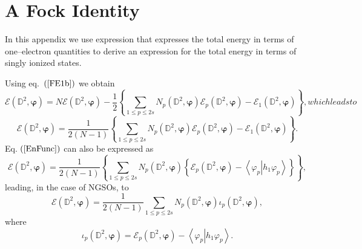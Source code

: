 \documentclass[aps,preprint]{revtex4}%
\begin{document}
\section{A Fock Identity\label{FockID}}

In this appendix we use expression that expresses the total energy in terms of
one--electron quantities to derive an expression for the total energy in terms
of singly ionized states.

Using eq.\ $\left(  \ref{FE1b}\right)  $ we obtain
\begin{subequations}
\begin{equation}
\mathcal{E}\left(  \mathbb{D}^{2},\boldsymbol{\varphi}\right)  =N\mathcal{E}%
\left(  \mathbb{D}^{2},\boldsymbol{\varphi}\right)  -\frac{1}{2}\left\{
\sum_{1\leq p\leq2s}N_{p}\left(  \mathbb{D}^{2},\boldsymbol{\varphi}\right)
\mathcal{E}_{p}\left(  \mathbb{D}^{2},\boldsymbol{\varphi}\right)
-\mathcal{E}_{1}\left(  \mathbb{D}^{2},\boldsymbol{\varphi}\right)  \right\}
,
\end{equation}
which leads to
\end{subequations}
\begin{equation}
\mathcal{E}\left(  \mathbb{D}^{2},\boldsymbol{\varphi}\right)  =\frac
{1}{2\left(  N-1\right)  }\left\{  \sum_{1\leq p\leq2s}N_{p}\left(
\mathbb{D}^{2},\boldsymbol{\varphi}\right)  \mathcal{E}_{p}\left(
\mathbb{D}^{2},\boldsymbol{\varphi}\right)  -\mathcal{E}_{1}\left(
\mathbb{D}^{2},\boldsymbol{\varphi}\right)  \right\}  . \label{EnFunc}%
\end{equation}
Eq. $\left(  \ref{EnFunc}\right)  $ can also be expressed as
\begin{equation}
\mathcal{E}\left(  \mathbb{D}^{2},\boldsymbol{\varphi}\right)  =\frac
{1}{2\left(  N-1\right)  }\left\{  \sum_{1\leq p\leq2s}N_{p}\left(
\mathbb{D}^{2},\boldsymbol{\varphi}\right)  \left\{  \mathcal{E}_{p}\left(
\mathbb{D}^{2},\boldsymbol{\varphi}\right)  -\left\langle \left.  \varphi
_{p}\right\vert h_{1}\varphi_{p}\right\rangle \right\}  \right\}  ,
\label{EnFuncNew}%
\end{equation}
leading, in the case of NGSOs, to
\begin{equation}
\mathcal{E}\left(  \mathbb{D}^{2},\boldsymbol{\varphi}\right)  =\frac
{1}{2\left(  N-1\right)  }\sum_{1\leq p\leq2s}N_{p}\left(  \mathbb{D}%
^{2},\boldsymbol{\varphi}\right)  \iota_{p}\left(  \mathbb{D}^{2}%
,\boldsymbol{\varphi}\right)  ,
\end{equation}
where
\begin{equation}
\iota_{p}\left(  \mathbb{D}^{2},\boldsymbol{\varphi}\right)  =\mathcal{E}%
_{p}\left(  \mathbb{D}^{2},\boldsymbol{\varphi}\right)  -\left\langle \left.
\varphi_{p}\right\vert h_{1}\varphi_{p}\right\rangle .
\end{equation}
\end{document}
